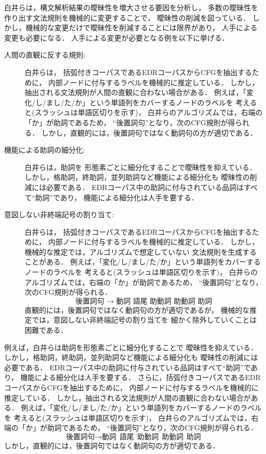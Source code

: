 白井らは，構文解析結果の曖昧性を増大させる要因を分析し，
多数の曖昧性を作り出す文法規則を機械的に変更することで，
曖昧性の削減を図っている．
しかし，機械的な変更だけで曖昧性を削減することには限界があり，
人手による変更も必要になる．
人手による変更が必要となる例を以下に挙げる．

\begin{description}
\item[人間の直観に反する規則: ] 白井らは，
  括弧付きコーパスであるEDRコーパスからCFGを抽出するために，
  内部ノードに付与するラベルを機械的に推定している．
  しかし，抽出される文法規則が人間の直観に合わない場合がある．
  例えば，「変化/し/まし/た/か」という単語列をカバーするノードのラベルを
  考えると(スラッシュは単語区切りを示す)，
  白井らのアルゴリズムでは，右端の「か」が助詞であるため，
  ``後置詞句''となり，次のCFG規則が得られる．
  しかし，直観的には，後置詞句ではなく動詞句の方が適切である．
\end{description}
\fi

\begin{description}
\item[機能による助詞の細分化: ] 白井らは，助詞を
  形態素ごとに細分化することで曖昧性を抑えている．
  しかし，格助詞，終助詞，並列助詞など機能による細分化も
  曖昧性の削減には必要である．
  EDRコーパス中の助詞に付与されている品詞はすべて``助詞''であり，
  機能による細分化は人手を要する．
\item[意図しない非終端記号の割り当て: ] 白井らは，
  括弧付きコーパスであるEDRコーパスからCFGを抽出するために，
  内部ノードに付与するラベルを機械的に推定している．
  しかし，機械的な推定では，アルゴリズムで想定していない
  文法規則を生成することがある．
  例えば，「変化/し/まし/た/か」という単語列をカバーするノードのラベルを
  考えると(スラッシュは単語区切りを示す)，
  白井らのアルゴリズムでは，右端の「か」が助詞であるため，
  ``後置詞句''となり，次のCFG規則が得られる．
  \[\mbox{後置詞句 → 動詞 語尾 助動詞 助動詞 助詞}\]
  直観的には，後置詞句ではなく動詞句の方が適切であるが，
  機械的な推定では，意図しない非終端記号の割り当てを
  細かく除外していくことは困難である．
\end{description}

例えば，白井らは助詞を形態素ごとに細分化することで
曖昧性を抑えている．
しかし，格助詞，終助詞，並列助詞など機能による細分化も
曖昧性の削減には必要である．
EDRコーパス中の助詞に付与されている品詞はすべて``助詞''であり，
機能による細分化は人手を要する．
さらに，括弧付きコーパスであるEDRコーパスからCFGを抽出するために，
内部ノードに付与するラベルを機械的に推定している．
しかし，抽出される文法規則が人間の直観に合わない場合がある．
例えば，「変化/し/まし/た/か」という単語列をカバーするノードのラベルを
考えると(スラッシュは単語区切りを示す)，
白井らのアルゴリズムでは，右端の「か」が助詞であるため，
``後置詞句''となり，次のCFG規則が得られる．
\[\mbox{後置詞句} \to \mbox{動詞}~~\mbox{語尾}~~\mbox{助動詞}~~\mbox{助動詞}
~~\mbox{助詞}\]
しかし，直観的には，後置詞句ではなく動詞句の方が適切である．
\fi

